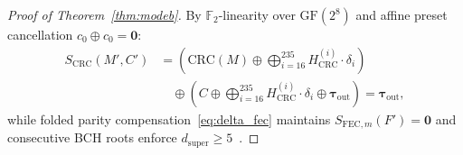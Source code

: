 \documentclass[11pt,letterpaper]{article}
\theoremstyle{spectralthm}
\begin{document}
\begin{proof}[Proof of Theorem~\ref{thm:modeb}]
By $\mathbb{F}_2$-linearity over $\mathrm{GF}(2^8)$ and affine preset cancellation $c_0 \oplus c_0 = \mathbf{0}$:
\begin{equation}
\label{eq:crc_cancel}
\begin{aligned}
S_{\mathrm{CRC}}(M', C') &= \left(\mathrm{CRC}(M) \oplus \bigoplus_{i=16}^{235} H_{\mathrm{CRC}}^{(i)} \cdot \delta_i\right)\\
&\quad\oplus \left(C \oplus \bigoplus_{i=16}^{235} H_{\mathrm{CRC}}^{(i)} \cdot \delta_i \oplus \boldsymbol{\tau}_{\mathrm{out}}\right)
= \boldsymbol{\tau}_{\mathrm{out}},
\end{aligned}
\end{equation}
while folded parity compensation~\eqref{eq:delta_fec} maintains $S_{\mathrm{FEC},m}(F') = \mathbf{0}$ and consecutive BCH roots enforce $d_{\mathrm{super}} \ge 5$~\cite{macwilliams1977theorytheorytheorytheorytheorytheorytheorytheorytheorytheorytheorytheorytheorytheorytheorytheory}.
\end{proof}
\end{document}
